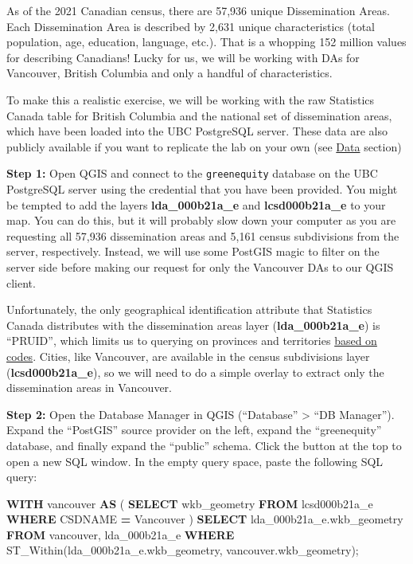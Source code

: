 \documentclass[
]{book}
\newenvironment{Shaded}{\begin{snugshade}}{\end{snugshade}}
\newcommand{\KeywordTok}[1]{\textcolor[rgb]{0.13,0.29,0.53}{\textbf{#1}}}
\newcommand{\NormalTok}[1]{#1}
\newcommand{\OperatorTok}[1]{\textcolor[rgb]{0.81,0.36,0.00}{\textbf{#1}}}
\newcommand{\StringTok}[1]{\textcolor[rgb]{0.31,0.60,0.02}{#1}}
\begin{document}
As of the 2021 Canadian census, there are 57,936 unique Dissemination Areas. Each Dissemination Area is described by 2,631 unique characteristics (total population, age, education, language, etc.). That is a whopping 152 million values for describing Canadians! Lucky for us, we will be working with DAs for Vancouver, British Columbia and only a handful of characteristics.

To make this a realistic exercise, we will be working with the raw Statistics Canada table for British Columbia and the national set of dissemination areas, which have been loaded into the UBC PostgreSQL server. These data are also publicly available if you want to replicate the lab on your own (see \protect\hyperlink{data}{Data} section)

\textbf{Step 1:} Open QGIS and connect to the \texttt{greenequity} database on the UBC PostgreSQL server using the credential that you have been provided. You might be tempted to add the layers \textbf{lda\_000b21a\_e} and \textbf{lcsd000b21a\_e} to your map. You can do this, but it will probably slow down your computer as you are requesting all 57,936 dissemination areas and 5,161 census subdivisions from the server, respectively. Instead, we will use some PostGIS magic to filter on the server side before making our request for only the Vancouver DAs to our QGIS client.

Unfortunately, the only geographical identification attribute that Statistics Canada distributes with the dissemination areas layer (\textbf{lda\_000b21a\_e}) is ``PRUID'', which limits us to querying on provinces and territories \href{https://www12.statcan.gc.ca/census-recensement/2021/geo/ref/domain-domaine/index2021-eng.cfm?lang=e\&id=PRUID}{based on codes}. Cities, like Vancouver, are available in the census subdivisions layer (\textbf{lcsd000b21a\_e}), so we will need to do a simple overlay to extract only the dissemination areas in Vancouver.

\textbf{Step 2:} Open the Database Manager in QGIS (``Database'' \textgreater{} ``DB Manager''). Expand the ``PostGIS'' source provider on the left, expand the ``greenequity'' database, and finally expand the ``public'' schema. Click the button at the top to open a new SQL window. In the empty query space, paste the following SQL query:

\begin{Shaded}
\begin{Highlighting}[]
\KeywordTok{WITH}\NormalTok{ vancouver }\KeywordTok{AS}\NormalTok{ (}
    \KeywordTok{SELECT}\NormalTok{ wkb\_geometry }\KeywordTok{FROM}\NormalTok{ lcsd000b21a\_e  }
    \KeywordTok{WHERE}\NormalTok{ CSDNAME }\OperatorTok{=} \StringTok{\textquotesingle{}Vancouver\textquotesingle{}}
\NormalTok{)}
\KeywordTok{SELECT}\NormalTok{ lda\_000b21a\_e.wkb\_geometry}
\KeywordTok{FROM}\NormalTok{ vancouver, lda\_000b21a\_e}
\KeywordTok{WHERE}\NormalTok{ ST\_Within(lda\_000b21a\_e.wkb\_geometry, vancouver.wkb\_geometry);}
\end{Highlighting}
\end{Shaded}
\end{document}
